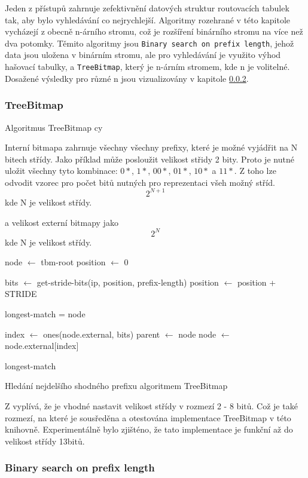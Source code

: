 Jeden z přístupů zahrnuje zefektivnění datových struktur routovacích tabulek tak,
aby bylo vyhledávání co nejrychlejší. Algoritmy rozehrané v této kapitole vycházejí z obecně n-árního stromu,
což je rozšíření binárního stromu na více než dva potomky. Těmito algoritmy jsou
\texttt{Binary search on prefix length}, jehož data jsou uložena v binárním stromu, ale pro vyhledávání
je využito výhod hašovací tabulky, a \texttt{TreeBitmap}, který je n-árním stromem, kde n je volitelné.
Dosažené výsledky pro různé n jsou vizualizovány v kapitole \ref{}.

\subsubsection{TreeBitmap}

Algoritmus TreeBitmap cy

Interní bitmapa zahrnuje všechny všechny prefixy, které je možné vyjádřit na N bitech střídy.
Jako příklad může posloužit velikost střidy 2 bity.
Proto je nutné uložit všechny tyto kombinace: $0*$, $1*$, $00*$, $01*$, $10*$ a $11*$.
Z toho lze odvodit vzorec pro počet bitů nutných pro reprezentaci všeh možný stříd.
$$2^{N + 1}$$
kde N je velikost střídy.

a velikost externí bitmapy jako
$$2^N$$
kde N je velikost střídy.




\begin{algorithm}
	node $\leftarrow$ tbm-root\;
	position $\leftarrow$ 0\;
	{
		bits $\leftarrow$ get-stride-bits(ip, position, prefix-length)\;
		position $\leftarrow$ position + STRIDE\;

		{
			longest-match = node\;
		}

		index $\leftarrow$ ones(node.external, bits)\;
		parent $\leftarrow$ node\;
		node $\leftarrow$ node.external[index]\;
	}
	\Return longest-match\;
	\caption{Hledání nejdelšího shodného prefixu algoritmem TreeBitmap}
\end{algorithm}


Z \cite{tbm} vyplívá, že je vhodné nastavit velikost střídy v rozmezí 2 - 8 bitů. Což je také rozmezí,
na které je sousředěna a otestována implementace TreeBitmap v této knihovně. Experimentálně bylo zjišténo,
že tato implementace je funkční až do velikost střídy 13bitů.

\subsubsection{Binary search on prefix length}

